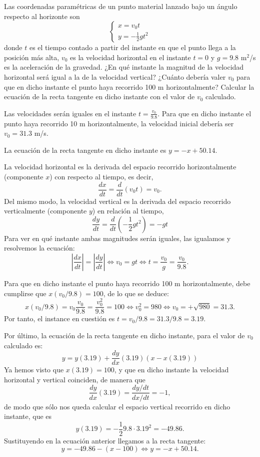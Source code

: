 {Las coordenadas paramétricas de un punto material lanzado bajo un ángulo respecto al horizonte son
\[
\left\{
  \begin{array}{ll}
    x=v_0t \\
    y=-\frac{1}{2}gt^2
  \end{array}
\right.
\]
donde $t$ es el tiempo contado a partir del instante en que el punto llega a la posición más alta, $v_0$ es la velocidad horizontal en el instante $t=0$ y $g=9.8$ m$^2$/s es la aceleración de la gravedad. ¿En qué instante la magnitud de la velocidad horizontal será igual a la de la velocidad vertical? ¿Cuánto debería valer $v_0$ para que en dicho instante el punto haya recorrido 100 m horizontalmente? Calcular la ecuación de la recta tangente en dicho instante con el valor de $v_0$ calculado.
}
{
Las velocidades serán iguales en el instante $ t=\frac{v_0}{9.8}$. Para que en dicho instante el punto haya recorrido 10  m horizontalmente, la velocidad inicial debería ser $v_0 = 31.3$ m/s.

La ecuación de la recta tangente en dicho instante es $y =-x+50.14$.
}
{La velocidad horizontal es la derivada del espacio recorrido horizontalmente (componente $x$) con respecto al tiempo, es decir,
\[
\frac{dx}{dt} = \frac{d}{dt}(v_0t)=v_0.
\]
Del mismo modo, la velocidad vertical es la derivada del espacio recorrido verticalmente (componente $y$) en relación al tiempo,
\[
\frac{dy}{dt} = \frac{d}{dt}(-\frac{1}{2}gt^2)=-gt
\]
Para ver en qué instante ambas magnitudes serán iguales, las igualamos y resolvemos la ecuación:
\[
|\frac{dx}{dt}|=|\frac{dy}{dt}| \Leftrightarrow v_0 = gt \Leftrightarrow t=\frac{v_0}{g}=\frac{v_0}{9.8}.
\]

Para que en dicho instante el punto haya recorrido 100 m horizontalmente, debe cumplirse que $x(v_0/9.8)=100$, de lo que se deduce:
\[
x(v_0/9.8)=v_0\frac{v_0}{9.8} = \frac{v_0^2}{9.8}=100 \Leftrightarrow v_0^2 = 980 \Leftrightarrow v_0 = +\sqrt{980}= 31.3.
\]
Por tanto, el instance en cuestión es $t=v_0/9.8= 31.3/9.8 = 3.19$.

Por último, la ecuación de la recta tangente en dicho instante, para el valor de $v_0$ calculado es:
\[
y = y(3.19) + \frac{dy}{dx}(3.19) (x-x(3.19))
\]
Ya hemos visto que $x(3.19)=100$, y que en dicho instante la velocidad horizontal y vertical coinciden, de manera que
\[
\frac{dy}{dx}(3.19)=\frac{dy/dt}{dx/dt}=-1,
\]
de modo que sólo nos queda calcular el espacio vertical recorrido en dicho instante, que es
\[
y(3.19)=-\frac{1}{2}9.8\cdot 3.19^2= -49.86.
\]
Sustituyendo en la ecuación anterior llegamos a la recta tangente:
\[
y = -49.86-(x-100) \Leftrightarrow y=-x+50.14.
\]
}


